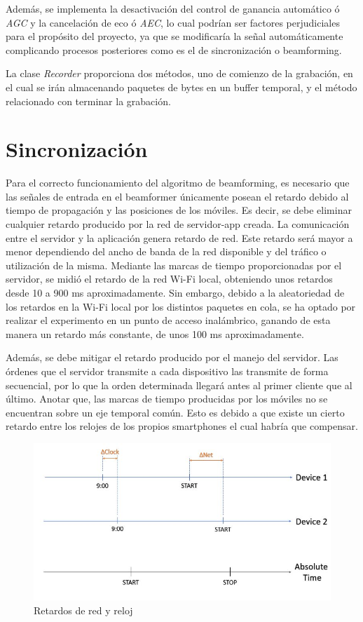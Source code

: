 \documentclass[a4paper,11pt]{book}
\begin{document}
\begin{itemize}
	Además, se implementa la desactivación del control de ganancia automático ó \textit{AGC} y la cancelación de eco ó \textit{AEC}, lo cual podrían ser factores perjudiciales para el propósito del proyecto, ya que se modificaría la señal automáticamente complicando procesos posteriores como es el de sincronización o beamforming.
	
	La clase \textit{Recorder} proporciona dos métodos, uno de comienzo de la grabación, en el cual se irán almacenando paquetes de bytes en un buffer temporal, y el método relacionado con terminar la grabación.
	\end{itemize}
	
	
	
\chapter{Sincronización}



Para el correcto funcionamiento del algoritmo de beamforming, es necesario que las señales de entrada en el beamformer únicamente posean el retardo debido al tiempo de propagación y las posiciones de los móviles. Es decir, se debe eliminar cualquier retardo producido por la red de servidor-app creada. La comunicación entre el servidor y la aplicación genera retardo de red. Este retardo será mayor a menor dependiendo del ancho de banda de la red disponible y del tráfico o utilización de la misma. Mediante las marcas de tiempo proporcionadas por el servidor, se midió el retardo de la red Wi-Fi local, obteniendo unos retardos desde 10 a 900 ms aproximadamente. Sin embargo, debido a la aleatoriedad de los retardos en la Wi-Fi local por los distintos paquetes en cola, se ha optado por realizar el experimento en un punto de acceso inalámbrico, ganando de esta manera un retardo más constante, de unos 100 ms aproximadamente.


Además, se debe mitigar el retardo producido por el manejo del servidor. Las órdenes que el servidor transmite a cada dispositivo las transmite de forma secuencial, por lo que la orden determinada llegará antes al primer cliente que al último. Anotar que, las marcas de tiempo producidas por los móviles no se encuentran sobre un eje temporal común. Esto es debido a que existe un cierto retardo entre los relojes de los propios smartphones el cual habría que compensar.

\begin{figure}[hbtp]
\centering
\includegraphics[width = 12cm]{FIGURAS/ejes_temporales.JPG}
\caption{Retardos de red y reloj}
\label{retardos}
\end{figure}
\end{document}
